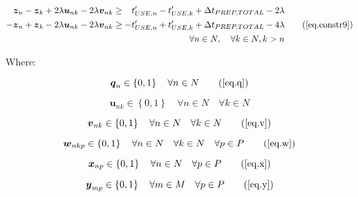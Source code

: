 \begin{equation}
    \begin{split}
        \begin{alignedat}{10}
        &\boldsymbol{z}_{n} {}-{} &\boldsymbol{z}_{k} {}+{} &2 \lambda
        \boldsymbol{u}_{nk} {}-{} &2 \lambda \boldsymbol{v}_{nk} &\ge
        &t_{USE,n}^{\prime} {}-{} &t_{USE,k}^{\prime} {}+{}
        &\Delta &t_{PREP,TOTAL} {}-{} 2 &\lambda\\
        - &\boldsymbol{z}_{n} {}+{} &\boldsymbol{z}_{k} {}-{} &2 \lambda
        \boldsymbol{u}_{nk} {}-{} &2 \lambda \boldsymbol{v}_{nk} &\ge
        - &t_{USE,n}^{\prime} {}+{} &t_{USE,k}^{\prime} {}+{}
        &\Delta &t_{PREP,TOTAL} {}-{} 4 &\lambda
        \end{alignedat}
        \\\forall n \in N, \quad \forall k \in N, k > n
    \end{split}
    \tag{\ref{eq.constr9}}
\end{equation}

Where:

\begin{equation}
    \boldsymbol{q}_{n} \in \left\{ 0, 1 \right\} \quad \forall n \in N
    \tag{\ref{eq.q}}
\end{equation}

\begin{equation}
    \boldsymbol{u}_{nk} \in \left\{ 0, 1 \right\} \quad \forall n \in N \quad
    \forall k \in N
    \label{eq.u}
\end{equation}

\begin{equation}
    \boldsymbol{v}_{nk} \in \left\{ 0, 1 \right\} \quad \forall n \in N \quad
    \forall k \in N
    \tag{\ref{eq.v}}
\end{equation}

\begin{equation}
    \boldsymbol{w}_{nkp} \in \left\{ 0, 1 \right\} \quad \forall n \in N \quad
    \forall k \in N \quad \forall p \in P
    \tag{\ref{eq.w}}
\end{equation}

\begin{equation}
    \boldsymbol{x}_{np} \in \left\{ 0, 1 \right\} \quad \forall n \in N \quad
    \forall p \in P
    \tag{\ref{eq.x}}
\end{equation}

\begin{equation}
    \boldsymbol{y}_{mp} \in \left\{ 0, 1 \right\} \quad \forall m \in M \quad
    \forall p \in P
    \tag{\ref{eq.y}}
\end{equation}

